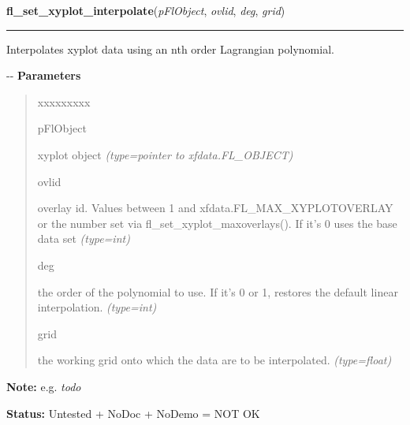 \hspace{.8\funcindent}\begin{boxedminipage}{\funcwidth}

    \raggedright \textbf{fl\_set\_xyplot\_interpolate}(\textit{pFlObject}, \textit{ovlid}, \textit{deg}, \textit{grid})

    \vspace{-1.5ex}

    \rule{\textwidth}{0.5\fboxrule}
\setlength{\parskip}{2ex}

Interpolates xyplot data using an nth order Lagrangian polynomial.

-{}-
\setlength{\parskip}{1ex}
      \textbf{Parameters}
      \vspace{-1ex}

      \begin{quote}
        \begin{Ventry}{xxxxxxxxx}

          \item[pFlObject]


xyplot object
            {\it (type=pointer to xfdata.FL\_OBJECT)}

          \item[ovlid]


overlay id. Values between 1 and xfdata.FL\_MAX\_XYPLOTOVERLAY or the
number set via fl\_set\_xyplot\_maxoverlays(). If it's 0 uses the base
data set
            {\it (type=int)}

          \item[deg]


the order of the polynomial to use. If it's 0 or 1, restores the
default linear interpolation.
            {\it (type=int)}

          \item[grid]


the working grid onto which the data are to be interpolated.
            {\it (type=float)}

        \end{Ventry}

      \end{quote}

\textbf{Note:} 
e.g. \emph{todo}


\textbf{Status:} 
Untested + NoDoc + NoDemo = NOT OK


    \end{boxedminipage}

    \label{xformslib:flxyplot:fl_set_xyplot_inspect}

